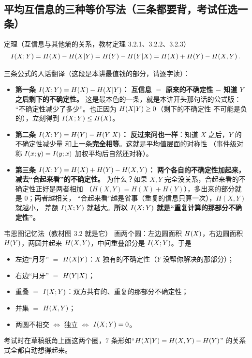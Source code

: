 \subsection{平均互信息的三种等价写法（三条都要背，考试任选一条）}

\begin{defbox}{定理（互信息与其他熵的关系，教材定理 3.2.1、3.2.2、3.2.3）}
\[
\I{X;Y}=\Hx{X}-\Hx{X|Y}=\Hx{Y}-\Hx{Y|X}=\Hx{X}+\Hx{Y}-\Hx{X,Y}.
\]
\end{defbox}

三条公式的人话翻译（这段是本讲最值钱的部分，请逐字读）：

\begin{itemize}[leftmargin=1.6em,itemsep=3pt,topsep=2pt]
  \item \textbf{第一条 $I\!\left(X;Y\right)=H\!\left(X\right)-H\!\left(X|Y\right)$：}
        \textbf{互信息 $=$ 原来的不确定性 $-$ 知道 $Y$ 之后剩下的不确定性。}
        这是最本色的一条，就是本讲开头那句话的公式版：
        “不确定性减少了多少”。也正因为 $H\!\left(X|Y\right)\ge0$（剩下的不确定性
        不可能是负的），立刻得到 $I\!\left(X;Y\right)\le H\!\left(X\right)$。
  \item \textbf{第二条 $I\!\left(X;Y\right)=H\!\left(Y\right)-H\!\left(Y|X\right)$：}
        \textbf{反过来问也一样}：知道 $X$ 之后，$Y$ 的不确定性减少量
        和上一条\textbf{完全相等}。这就是平均值层面的对称性
        （事件级对称 $I\!\left(x;y\right)=I\!\left(y;x\right)$ 加权平均后自然还对称）。
  \item \textbf{第三条 $I\!\left(X;Y\right)=H\!\left(X\right)+H\!\left(Y\right)-H\!\left(X,Y\right)$：}
        \textbf{两个各自的不确定性加起来，减去“合起来看”的不确定性。}
        为什么？如果 $X,Y$ 完全没关系，合起来看的不确定性正好是两者相加
        （$H(X,Y)=H(X)+H(Y)$），多出来的部分就是 $0$；两者越相关，
        “合起来看”越是省事（重复的信息只算一次），$H(X,Y)$ 就越小，
        差额 $I\!\left(X;Y\right)$ 就越大。\textbf{所以 $I\!\left(X;Y\right)$ 就是“重复计算的那部分不确定性”。}
\end{itemize}

\begin{idea}{韦恩图记忆法（教材图 3.2 就是它）}
画两个圆：左边圆面积 $H\!\left(X\right)$，右边圆面积 $H\!\left(Y\right)$，两圆并起来
$H\!\left(X,Y\right)$，中间重叠部分是 $I\!\left(X;Y\right)$。于是
\begin{itemize}[leftmargin=1.4em,itemsep=1pt,topsep=1pt]
  \item 左边“月牙” $=$ $H\!\left(X|Y\right)$：$X$ 独有的不确定性（$Y$ 没帮你解决的那部分）；
  \item 右边“月牙” $=$ $H\!\left(Y|X\right)$；
  \item 重叠 $=$ $I\!\left(X;Y\right)$：双方共有的、重复的那部分不确定性；
  \item 并集 $=$ $H\!\left(X,Y\right)$；
  \item 两圆不相交 $\iff$ 独立 $\iff$ $I\!\left(X;Y\right)=0$。
\end{itemize}
考试时在草稿纸角上画这两个圈，$7$ 条形如“$H\!\left(X|Y\right)=H\!\left(X,Y\right)-H\!\left(Y\right)$”
的关系式全都自动想得起来。
\end{idea}

